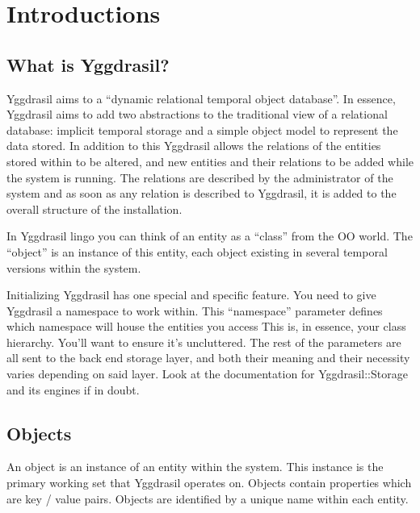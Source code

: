 \documentclass[english,a4paper]{article}
\begin{document}


\tableofcontents

\newpage

\section{Introductions}

\subsection{What is Yggdrasil?}

Yggdrasil aims to a ``dynamic relational temporal object database''.
In essence, Yggdrasil aims to add two abstractions to the traditional
view of a relational database: implicit temporal storage and a simple
object model to represent the data stored.  In addition to this
Yggdrasil allows the relations of the entities stored within to be
altered, and new entities and their relations to be added while the
system is running.  The relations are described by the administrator
of the system and as soon as any relation is described to Yggdrasil,
it is added to the overall structure of the installation.  

In Yggdrasil lingo you can think of an entity as a ``class'' from the
OO world.  The ``object'' is an instance of this entity, each object
existing in several temporal versions within the system.

Initializing Yggdrasil has one special and specific feature.  You need
to give Yggdrasil a namespace to work within.  This ``namespace''
parameter defines which namespace will house the entities you access
This is, in essence, your class hierarchy.  You'll want to ensure it's
uncluttered.  The rest of the parameters are all sent to the back end
storage layer, and both their meaning and their necessity varies
depending on said layer.  Look at the documentation for
Yggdrasil::Storage and its engines if in doubt.

\subsection{Objects}

An object is an instance of an entity within the system.  This
instance is the primary working set that Yggdrasil operates on.
Objects contain properties which are key / value pairs.  Objects are
identified by a unique name within each entity.

\end{document}
